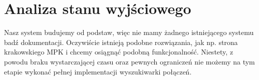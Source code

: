 \section{Analiza stanu wyjściowego}


Nasz system budujemy od podstaw, więc nie mamy żadnego istniejącego systemu badź dokumentacji. Oczywiście istnieją podobne rozwiązania,
jak np. strona krakowskiego MPK i chcemy osiągnąć podobną funkcjonalność. Niestety, z powodu braku wystarczającej czasu oraz pewnych ograniczeń nie możemy na tym etapie wykonać pełnej implementacji wyszukiwarki połączeń.



